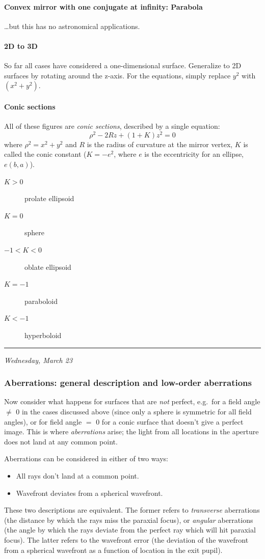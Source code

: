 \documentclass[12pt]{article}
\newcommand{\mydate}[1]{
    \begin{flushright}
        \rule{\textwidth}{0.4pt} %
        \small\hfill\textit{#1}
    \end{flushright}}
\begin{document}
\paragraph{Convex mirror with one conjugate at infinity: Parabola}
\ldots but this has no astronomical applications.

\paragraph{2D to 3D}
So far all cases have considered a one-dimensional surface.
Generalize to 2D surfaces by rotating around the z-axis.
For the equations, simply replace $y^{2}$ with $(x^{2} + y^{2})$.

\paragraph{Conic sections}
All of these figures are
\emph{conic sections}, described by a single equation:
\[
    \rho^{2} - 2Rz + (1+K)z^{2} = 0
    \]
where $ \rho^{2} = x^{2} + y^{2} $
and $R$ is the radius of curvature at the mirror vertex,
$K$ is called the conic constant ($K = -e^{2}$, where $e$ is the eccentricity for
an ellipse, $e(b, a)$).
\begin{description}
    \item [$K > 0$] prolate ellipsoid
    \item [$K = 0$] sphere
    \item [$-1 < K < 0$] oblate ellipsoid
    \item [$K = - 1$] paraboloid
    \item [$K < - 1$] hyperboloid
\end{description}

\mydate{Wednesday, March 23}
\subsubsection{Aberrations: general description and low-order aberrations}
Now consider what happens for surfaces that are \emph{not} perfect, e.g.\ for a
field angle $\neq$ 0 in the cases discussed above (since only a sphere is
symmetric for all field angles), or for field angle $=$ 0 for a conic surface
that doesn't give a perfect image. This is where \textit{aberrations} arise;
the light from all locations in the aperture does not land at any common point.

Aberrations can be considered in either of two ways:
\begin{itemize}
    \item All rays don't land at a common point.
    \item Wavefront deviates from a spherical wavefront.
\end{itemize}
These two descriptions are equivalent. The former refers to \textit{transverse}
aberrations (the distance by which the rays miss the paraxial focus), or
\textit{angular} aberrations (the angle by which the rays deviate from the
perfect ray which will hit paraxial focus). The latter refers to the wavefront
error (the deviation of the wavefront from a spherical wavefront as a function
of location in the exit pupil).
\end{document}
